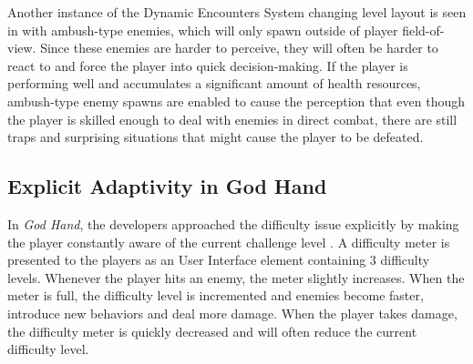 Another instance of the Dynamic Encounters System changing level layout is seen in with ambush-type enemies, which will only spawn outside of player field-of-view. Since these enemies are harder to perceive, they will often be harder to react to and force the player into quick decision-making. If the player is performing well and accumulates a significant amount of health resources, ambush-type enemy spawns are enabled to cause the perception that even though the player is skilled enough to deal with enemies in direct combat, there are still traps and surprising situations that might cause the player to be defeated.





\subsection{Explicit Adaptivity in God Hand}



In \emph{God Hand}, the developers approached the difficulty issue explicitly by making the player constantly aware of the current challenge level \cite{article_subjectivedifficulty}. A difficulty meter is presented to the players as an User Interface element containing 3 difficulty levels. Whenever the player hits an enemy, the meter slightly increases. When the meter is full, the difficulty level is incremented and enemies become faster, introduce new behaviors and deal more damage. When the player takes damage, the difficulty meter is quickly decreased and will often reduce the current difficulty level.

